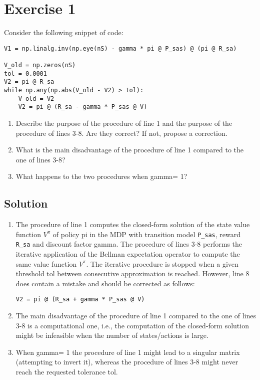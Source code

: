 \section{Exercise 1}

Consider the following snippet of code:
\begin{verbatim}
V1 = np.linalg.inv(np.eye(nS) - gamma * pi @ P_sas) @ (pi @ R_sa)

V_old = np.zeros(nS)
tol = 0.0001
V2 = pi @ R_sa
while np.any(np.abs(V_old - V2) > tol):
    V_old = V2
    V2 = pi @ (R_sa - gamma * P_sas @ V)
\end{verbatim}
\begin{enumerate}
    \item Describe the purpose of the procedure of line 1 and the purpose of the procedure of lines 3-8. 
        Are they correct? 
        If not, propose a correction.
    \item What is the main disadvantage of the procedure of line 1 compared to the one of lines 3-8?
    \item What happens to the two procedures when gamma= 1?
\end{enumerate}

\subsection*{Solution}
\begin{enumerate}
    \item The procedure of line 1 computes the closed-form solution of the state value function $V^\pi$ of policy pi in the MDP with transition model \texttt{P\_sas}, reward \texttt{R\_sa} and discount factor gamma. 
        The procedure of lines 3-8 performs the iterative application of the Bellman expectation operator to compute the same value function $V^\pi$. 
        The iterative procedure is stopped when a given threshold tol between consecutive approximation is reached. 
        However, line 8 does contain a mistake and should be corrected as follows:
        \begin{verbatim}
V2 = pi @ (R_sa + gamma * P_sas @ V)
        \end{verbatim}
    \item The main disadvantage of the procedure of line 1 compared to the one of lines 3-8 is a computational one, i.e., the computation of the closed-form solution might be infeasible when the number of states/actions is large.
    \item When gamma= 1 the procedure of line 1 might lead to a singular matrix (attempting to invert it), whereas the procedure of lines 3-8 might never reach the requested tolerance tol.
\end{enumerate}